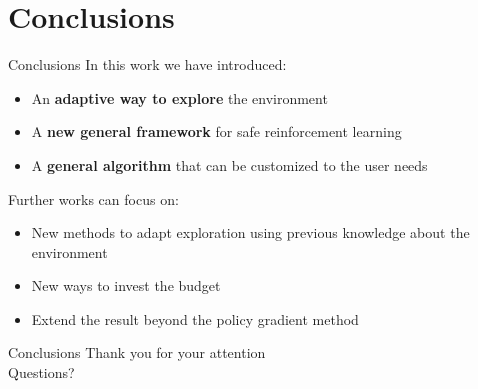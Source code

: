 \documentclass{beamer}
\begin{document}
\section{Conclusions}

\begin{frame}{Conclusions}
In this work we have introduced:
\begin{itemize}
\item An \textbf{adaptive way to explore} the environment
\item A \textbf{new general framework} for safe reinforcement learning
\item A \textbf{general algorithm} that can be customized to the user needs
\end{itemize}
\vfill
Further works can focus on:
\begin{itemize}
\item New methods to adapt exploration using previous knowledge about the environment
\item New ways to invest the budget
\item Extend the result beyond the policy gradient method
\end{itemize}

\end{frame}

%
%

\begin{frame}{Conclusions}
\centering
\LARGE Thank you for your attention\\
\vspace{2cm}
Questions?
\end{frame}
\end{document}
